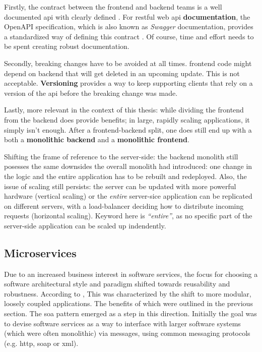 Firstly, the contract between the \gls{frontend} and \gls{backend} teams is a
well documented \gls{api} with clearly defined . For \gls{restful}
web \gls{api} \textbf{documentation}, the OpenAPI
specification, which is also known as
\textit{Swagger} documentation, provides a standardized way of defining this
contract \autocite{Koren_Klamma_2018}. Of course, time and effort needs to be
spent creating robust documentation. 

Secondly, breaking changes have to be avoided at all times. \Gls{frontend} code
might depend on backend  that will get deleted in an
upcoming update. This is not acceptable.
\textbf{Versioning} provides a
way to keep supporting clients that rely on a version of the \gls{api} before
the breaking change was made.

Lastly, more relevant in the context of this thesis: while dividing the
\gls{frontend} from the \gls{backend} does provide benefits; in large, rapidly
scaling applications, it simply isn't enough. After a
\gls{frontend}-\gls{backend} split, one does still end up with a both a
\textbf{\gls{monolithic} \gls{backend}} and a \textbf{\gls{monolithic}
\gls{frontend}}. 

Shifting the frame of reference to the server-side: the \gls{backend}
\gls{monolith} still posesses the same downsides the overall \gls{monolith} had
introduced: one change in the logic and the entire application has to be
rebuilt and redeployed. Also, the issue of scaling still persists: the server
can be updated with more powerful hardware (vertical scaling) or the \textit{entire}
server-sice application can be replicated on different servers, with a
\gls{load-balancer} deciding how to distribute incoming requests (horizontal scaling).
Keyword here is \textit{``entire''}, as no specific part of the server-side
application can be scaled up indendently. 


\subsection{Microservices} 

Due to an increased business interest in software services, the focus for
choosing a software architectural style and paradigm shifted towards reusability
and robustness. According to \textcite{Dragoni_etal_2018}, This was
characterized by the shift to more modular, loosely coupled applications. The
benefits of which were outlined in the previous section. The \gls{soa} pattern
emerged as a step in this direction. Initially the goal was to devise software
services as a way to interface with larger software systems (which were often
monolithic) via messages, using common messaging protocols (e.g. \gls{http},
\gls{soap} or \gls{xml}).

